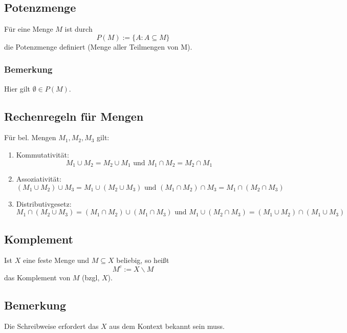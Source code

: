 \subsection{Potenzmenge}
Für eine Menge $M$ ist durch
\begin{equation*}
    P(M) := \{ A: A \subseteq M \}
\end{equation*}
die Potenzmenge definiert (Menge aller Teilmengen von M).

\subsubsection{Bemerkung}
Hier gilt $\emptyset \in P(M)$.

\subsection{Rechenregeln für Mengen}
Für bel. Mengen $M_1, M_2, M_3$ gilt:
\begin{enumerate}[label= (\alph*)]
    \item Kommutativität:
        \begin{equation*}
            M_1 \cup M_2 = M_2 \cup M_1 \text{ und }
            M_1 \cap M_2 = M_2 \cap M_1
        \end{equation*}
    \item Assoziativität:
        \begin{equation*}
            (M_1 \cup M_2) \cup M_3 = M_1 \cup (M_2 \cup M_3) \text{ und }
            (M_1 \cap M_2) \cap M_3 = M_1 \cap (M_2 \cap M_3)
        \end{equation*}
    \item Distributivgesetz:
        \begin{equation*}
            M_1 \cap (M_2 \cup M_3) = (M_1 \cap M_2) \cup (M_1 \cap M_3)
            \text{ und }
            M_1 \cup (M_2 \cap M_3) = (M_1 \cup M_2) \cap (M_1 \cup M_3)
        \end{equation*}
\end{enumerate}

\subsection{Komplement}
Ist $X$ eine feste Menge und $M \subseteq X$ beliebig, so heißt
\begin{equation*}
    M^c := X \backslash M
\end{equation*}
das Komplement von $M$ (bzgl, $X$).

\subsection{Bemerkung}
Die Schreibweise erfordert das $X$ aus dem Kontext bekannt sein muss.


